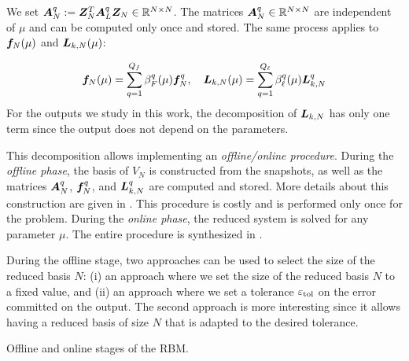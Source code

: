We set $\mat{A}_N^q := \mat{Z}_N^T \mat{A}_L^q\mat{Z}_N \in \R^{N\times N}$.
The matrices $\mat{A}_N^q\in\R^{N\times N}$ are independent of $\mu$ and can be computed only once and stored.
The same process applies to $\vct{f}_N(\mu)$ and $\vct{L}_{k,N}(\mu)$:

\begin{equation}
    \vct{f}_N(\mu) = \sum_{q=1}^{Q_f} \beta_F^q(\mu) \vct{f}^q_N, \quad
    \vct{L}_{k,N}(\mu) = \sum_{q=1}^{Q_\ell} \beta_\ell^q(\mu) \vct{L}^q_{k,N}
\end{equation}
For the outputs we study in this work, the decomposition of $\vct{L}_{k, N}$ has only one term since the output does not depend on the parameters.


This decomposition allows implementing an \emph{offline/online procedure}.
During the \emph{offline phase}, the basis of $V_N$ is constructed from the snapshots, as well as the matrices $\mat{A}_N^q$, $\vct{f}_N^q$, and $\vct{L}_{k, N}^q$ are computed and stored.
More details about this construction are given in .
This procedure is costly and is performed only once for the problem.
During the \emph{online phase}, the reduced system  is solved for any parameter $\mu$.
The entire procedure is synthesized in .

During the offline stage, two approaches can be used to select the size of the reduced basis $N$:
(i) an approach where we set the size of the reduced basis $N$ to a fixed value, and
(ii) an approach where we set a tolerance $\varepsilon_{\text{tol}}$ on the error committed on the output.
The second approach is more interesting since it allows having a reduced basis of size $N$ that is adapted to the desired tolerance.


\begin{algorithm}


    \caption{Offline and online stages of the RBM.}
    \label{algo:offline-online}
\end{algorithm}




